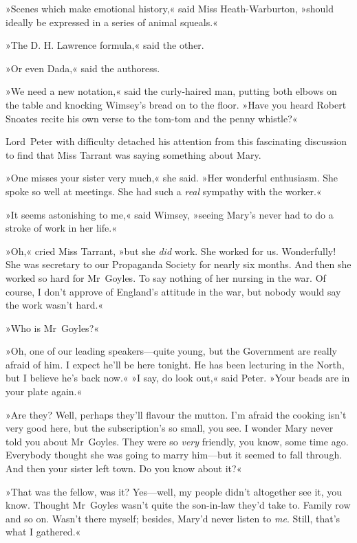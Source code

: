 »Scenes which make emotional history,« said Miss Heath-Warburton, »should ideally be expressed in a series of animal squeals.«

»The D. H. Lawrence formula,« said the other.

»Or even Dada,« said the authoress.

»We need a new notation,« said the curly-haired man, putting both elbows on the table and knocking Wimsey's bread on to the floor. »Have you heard Robert Snoates recite his own verse to the tom-tom and the penny whistle?«

Lord~Peter with difficulty detached his attention from this fascinating discussion to find that Miss Tarrant was saying something about Mary.

»One misses your sister very much,« she said. »Her wonderful enthusiasm. She spoke so well at meetings. She had such a \textit{real} sympathy with the worker.«

»It seems astonishing to me,« said Wimsey, »seeing Mary's never had to do a stroke of work in her life.«

»Oh,« cried Miss Tarrant, »but she \textit{did} work. She worked for us.  Wonderfully! She was secretary to our Propaganda Society for nearly six months. And then she worked so hard for Mr~Goyles. To say nothing of her nursing in the war. Of course, I don't approve of England's attitude in the war, but nobody would say the work wasn't hard.«

»Who is Mr~Goyles?«

»Oh, one of our leading speakers—quite young, but the Government are really afraid of him. I expect he'll be here tonight. He has been lecturing in the North, but I believe he's back now.«
»I say, do look out,« said Peter. »Your beads are in your plate again.«

»Are they? Well, perhaps they'll flavour the mutton. I'm afraid the cooking isn't very good here, but the subscription's so small, you see.  I wonder Mary never told you about Mr~Goyles. They were so \textit{very} friendly, you know, some time ago. Everybody thought she was going to marry him—but it seemed to fall through. And then your sister left town. Do you know about it?«

»That was the fellow, was it? Yes—well, my people didn't altogether see it, you know. Thought Mr~Goyles wasn't quite the son-in-law they'd take to. Family row and so on. Wasn't there myself; besides, Mary'd never listen to \textit{me}. Still, that's what I gathered.«

